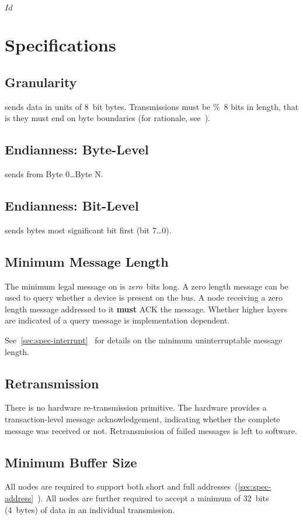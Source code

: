 \svnInfo $Id$

\section{Specifications}
\label{sec:spec}

\subsection{Granularity}
\bus sends data in units of 8~bit bytes. Transmissions must be \%~8 bits in
length, that is they must end on byte boundaries (for rationale,
see~).

\subsection{Endianness: Byte-Level}
\bus sends from Byte 0{\ldots}Byte N.

\subsection{Endianness: Bit-Level}
\bus sends bytes most significant bit first (bit 7{\ldots}0).

\subsection{Minimum Message Length}
The minimum legal message on \bus is {\em zero}~bits long. A zero length
message can be used to query whether a device is present on the bus. A node
receiving a zero length message addressed to it {\bf must} ACK the message.
Whether higher layers are indicated of a query message is implementation
dependent.

See~\ref{sec:spec-interrupt}~ for details on the
minimum uninterruptable message length.

\subsection{Retransmission}
There is no hardware re-transmission primitive. The hardware provides a
transaction-level message acknowledgement, indicating whether the complete
message was received or not. Retransmission of failed messages is left to
software.

\subsection{Minimum Buffer Size}
All \bus nodes are required to support both short and full
addresses~(\ref{sec:spec-address}~). All \bus nodes
are further required to accept a minimum of 32~bits (4~bytes) of data in an
individual transmission.

